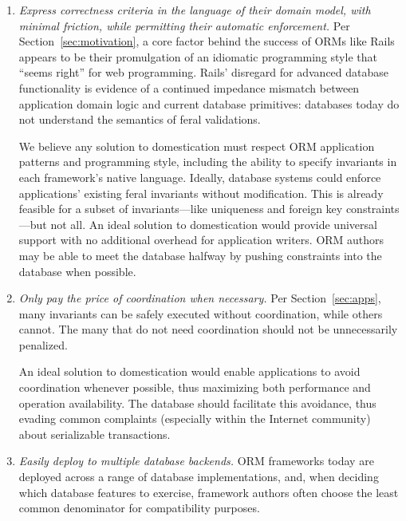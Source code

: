 \begin{enumerate} 
\item \textit{Express correctness criteria in the language of their
    domain model, with minimal friction, while permitting their
    automatic enforcement.} Per Section~\ref{sec:motivation}, a core
  factor behind the success of ORMs like Rails appears to be their
  promulgation of an idiomatic programming style that ``seems right''
  for web programming. Rails' disregard for advanced database
  functionality is evidence of a continued impedance mismatch between
  application domain logic and current database primitives: databases
  today do not understand the semantics of feral validations.
  \vspace{.25em}

  We believe any solution to domestication must respect ORM
  application patterns and programming style, including the ability to
  specify invariants in each framework's native language. Ideally,
  database systems could enforce applications' existing feral
  invariants without modification. This is already feasible for a
  subset of invariants---like uniqueness and foreign key
  constraints---but not all. An ideal solution to domestication would
  provide universal support with no additional overhead for
  application writers. ORM authors may be able to meet the database
  halfway by pushing constraints into the database when possible.

\item \textit{Only pay the price of coordination when necessary.} Per
  Section~\ref{sec:apps}, many invariants can be safely executed
  without coordination, while others cannot. The many that do not need
  coordination should not be unnecessarily penalized. \vspace{.25em}

  An ideal solution to domestication would enable applications to
  avoid coordination whenever possible, thus maximizing both
  performance and operation availability. The database should
  facilitate this avoidance, thus evading common complaints (especially
  within the Internet community) about serializable
  transactions.

\item \textit{Easily deploy to multiple database backends.}  ORM
  frameworks today are deployed across a range of database
  implementations, and, when deciding which database features to
  exercise, framework authors often choose the least common
  denominator for compatibility purposes.  \vspace{.25em}


\end{enumerate}
